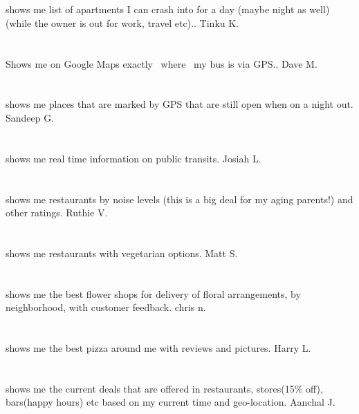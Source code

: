 \section{}shows me list of apartments I can crash into for a day (maybe night as well) (while the owner is out for work,  travel etc).. Tinku K.
\section{}Shows me on Google Maps exactly ~where~ my bus is via GPS.. Dave M.
\section{}shows me places that are marked by GPS that are still open when on a night out. Sandeep G.
\section{}shows me real time information on public transits. Josiah L.
\section{}shows me restaurants by noise levels (this is a big deal for my aging parents!) and other ratings. Ruthie V.
\section{}shows me restaurants with vegetarian options. Matt S.
\section{} shows me the best flower shops for delivery of floral arrangements,  by neighborhood,  with customer feedback. chris n.
\section{}shows me the best pizza around me with reviews and pictures. Harry L.
\section{}shows me the current deals that are offered in restaurants,  stores(15\% off),  bars(happy hours) etc based on my current time and geo-location. Aanchal J.
